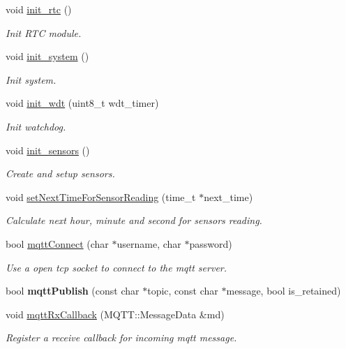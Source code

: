 \begin{DoxyCompactItemize}
void \hyperlink{rmap_8ino_ab985cc69f5f573113405b4f118c96d33}{init\+\_\+rtc} ()
\begin{DoxyCompactList}\small\item\em Init R\+TC module. \end{DoxyCompactList}\item 
void \hyperlink{rmap_8ino_afceb890a6ab9be73cc5481369538c705}{init\+\_\+system} ()
\begin{DoxyCompactList}\small\item\em Init system. \end{DoxyCompactList}\item 
void \hyperlink{rmap_8ino_a980e73df66b14b1190bc25da430a4f12}{init\+\_\+wdt} (uint8\+\_\+t wdt\+\_\+timer)
\begin{DoxyCompactList}\small\item\em Init watchdog. \end{DoxyCompactList}\item 
void \hyperlink{rmap_8ino_ac74850003fab6eb3269bfe043d0f939c}{init\+\_\+sensors} ()
\begin{DoxyCompactList}\small\item\em Create and setup sensors. \end{DoxyCompactList}\item 
void \hyperlink{rmap_8ino_a1686e2719fa4a37ef933458673973d28}{set\+Next\+Time\+For\+Sensor\+Reading} (time\+\_\+t $\ast$next\+\_\+time)
\begin{DoxyCompactList}\small\item\em Calculate next hour, minute and second for sensors reading. \end{DoxyCompactList}\item 
bool \hyperlink{rmap_8ino_a9f5e5ca8c47d4536dd1805e89fbb7db2}{mqtt\+Connect} (char $\ast$username, char $\ast$password)
\begin{DoxyCompactList}\small\item\em Use a open tcp socket to connect to the mqtt server. \end{DoxyCompactList}\item 
\mbox{\label{rmap_8ino_a9a46247768d3b87cbe261827b4f01e27}} 
bool {\bfseries mqtt\+Publish} (const char $\ast$topic, const char $\ast$message, bool is\+\_\+retained)
\item 
void \hyperlink{rmap_8ino_a4fe2f970295d296f7f6725fe9e946933}{mqtt\+Rx\+Callback} (M\+Q\+T\+T\+::\+Message\+Data \&md)
\begin{DoxyCompactList}\small\item\em Register a receive callback for incoming mqtt message. \end{DoxyCompactList}\item 

\end{DoxyCompactItemize}
